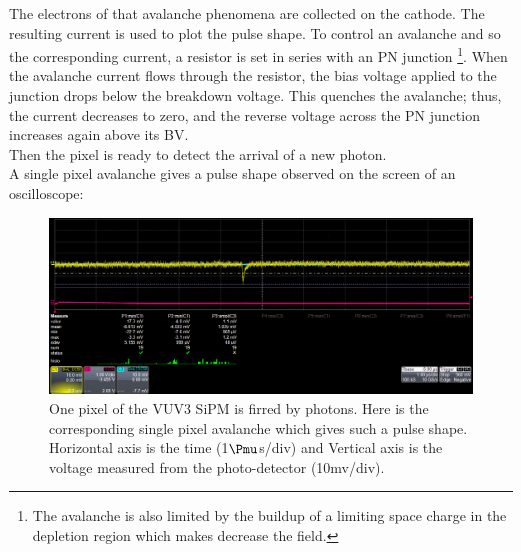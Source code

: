 \documentclass[a4paper, 11pt]{report}%
\begin{document}
  The electrons of that avalanche phenomena are collected on the cathode. The resulting current is used to plot the  pulse shape. 
  To control an avalanche and so the corresponding current, a resistor is set in series with an PN junction \footnote{The avalanche 
  is also limited by the buildup of a limiting space charge in the depletion region which makes decrease the field.}. 
  When the avalanche current flows through the resistor, the bias voltage applied to the junction drops below the breakdown voltage. 
  This quenches the avalanche; thus, the current decreases to zero, and the reverse voltage across the PN junction increases again above 
  its BV.\\
  Then the pixel is ready to detect the arrival of a new photon.
  \\
  
  A single pixel avalanche gives a pulse shape observed on the screen of an oscilloscope: 
  
  \begin{figure}[!hbtp] 
  \centering
    \includegraphics[totalheight=.2\textwidth,trim=0.3cm 6.6cm 0.1cm 0cm, clip=true,]{../Pictures/blabla/pulse_shape.png}
    \caption{One pixel of the VUV3 SiPM is firred by photons. Here is the corresponding single pixel avalanche which
    gives such a pulse shape. Horizontal axis is the time (1$\Pmu$s/div) and Vertical axis is the voltage measured from the photo-detector (10mv/div).}
    \label{fig:avalanche}
  \end{figure}
  
  
\end{document}
